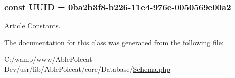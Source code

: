 \subsubsection[{U\+U\+I\+D}]{\setlength{\rightskip}{0pt plus 5cm}const U\+U\+I\+D = \textquotesingle{}0ba2b3f8-\/b226-\/11e4-\/976e-\/0050569e00a2\textquotesingle{}}\label{class_able_polecat___database___schema_a74b892c8c0b86bf9d04c5819898c51e7}
Article Constants. 

The documentation for this class was generated from the following file\+:\begin{DoxyCompactItemize}
\item 
C\+:/wamp/www/\+Able\+Polecat-\/\+Dev/usr/lib/\+Able\+Polecat/core/\+Database/\hyperlink{_schema_8php}{Schema.\+php}\end{DoxyCompactItemize}
